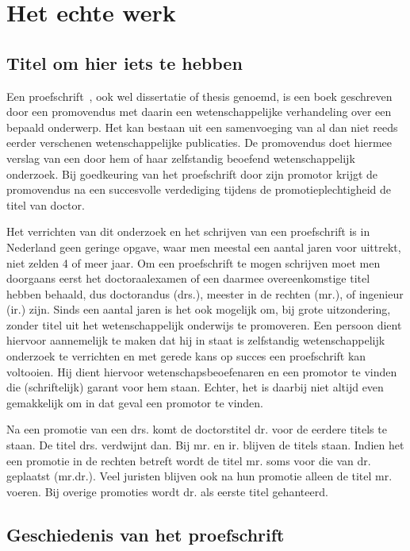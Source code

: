 \chapter{Het echte werk}
\label{cha:het-echte-werk}

\section{Titel om hier iets te hebben}
\label{sec:titel-om-hier}


Een proefschrift~\cite{wiki}, ook wel dissertatie of thesis genoemd, is een boek
geschreven door een promovendus met daarin een wetenschappelijke
verhandeling over een bepaald onderwerp. Het kan bestaan uit een
samenvoeging van al dan niet reeds eerder verschenen wetenschappelijke
publicaties. De promovendus doet hiermee verslag van een door hem of
haar zelfstandig beoefend wetenschappelijk onderzoek. Bij goedkeuring
van het proefschrift door zijn promotor krijgt de promovendus na een
succesvolle verdediging tijdens de promotieplechtigheid de titel van
doctor.

Het verrichten van dit onderzoek en het schrijven van een proefschrift
is in Nederland geen geringe opgave, waar men meestal een aantal jaren
voor uittrekt, niet zelden 4 of meer jaar. Om een proefschrift te
mogen schrijven moet men doorgaans eerst het doctoraalexamen of een
daarmee overeenkomstige titel hebben behaald, dus doctorandus (drs.),
meester in de rechten (mr.), of ingenieur (ir.) zijn. Sinds een aantal
jaren is het ook mogelijk om, bij grote uitzondering, zonder titel uit
het wetenschappelijk onderwijs te promoveren. Een persoon dient
hiervoor aannemelijk te maken dat hij in staat is zelfstandig
wetenschappelijk onderzoek te verrichten en met gerede kans op succes
een proefschrift kan voltooien. Hij dient hiervoor
wetenschapsbeoefenaren en een promotor te vinden die (schriftelijk)
garant voor hem staan. Echter, het is daarbij niet altijd even
gemakkelijk om in dat geval een promotor te vinden.

Na een promotie van een drs. komt de doctorstitel dr. voor de eerdere
titels te staan. De titel drs. verdwijnt dan. Bij mr. en ir. blijven
de titels staan. Indien het een promotie in de rechten betreft wordt
de titel mr. soms voor die van dr. geplaatst (mr.dr.). Veel juristen
blijven ook na hun promotie alleen de titel mr. voeren. Bij overige
promoties wordt dr. als eerste titel gehanteerd.

\section{Geschiedenis van het proefschrift}
\label{sec:geschiedenis-van-het}


